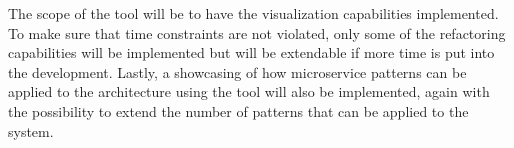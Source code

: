 The scope of the tool will be to have the visualization capabilities implemented.
To make sure that time constraints are not violated, only some of the refactoring capabilities will be implemented but will be extendable if more time is put into the development.
Lastly, a showcasing of how microservice patterns can be applied to the architecture using the tool will also be implemented, again with the possibility to extend the number of patterns that can be applied to the system.

